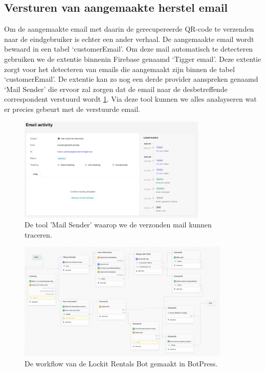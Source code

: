 \subsection{Versturen van aangemaakte herstel email}
\label{versturenQRcode}

Om de aangemaakte email met daarin de gerecupereerde QR-code te verzenden naar de eindgebruiker is echter een ander verhaal. De aangemaakte email wordt bewaard in een tabel ‘customerEmail’. Om deze mail automatisch te detecteren gebruiken we de extentie binnenin Firebase genaamd ‘Tigger email’. Deze extentie zorgt voor het detecteren van emails die aangemaakt zijn binnen de tabel ‘customerEmail’. De extentie kan zo nog een derde provider aanspreken genaamd ‘Mail Sender’ die ervoor zal zorgen dat de email naar de desbetreffende correspondent verstuurd wordt \ref{fig:resultaatEmailSender}. Via deze tool kunnen we alles analayseren wat er precies gebeurt met de verstuurde email. 

\begin{figure}[h]
    \centering
    \includegraphics[width=0.8\textwidth]{graphics/F35_mailSender.png}
    \captionsetup{justification=centering,singlelinecheck=false}
    \caption{De tool 'Mail Sender' waarop we de verzonden mail kunnen traceren.}
    \label{fig:resultaatEmailSender}
\end{figure}


\begin{figure}[h]
    \centering
    \includegraphics[angle=90, width=0.9\textwidth]{graphics/F36_workflowBotPress.jpg}
    \captionsetup{justification=centering}    
    \caption{De workflow van de Lockit Rentals Bot gemaakt in BotPress.}
    \label{fig:workflowBotPress}
\end{figure}

